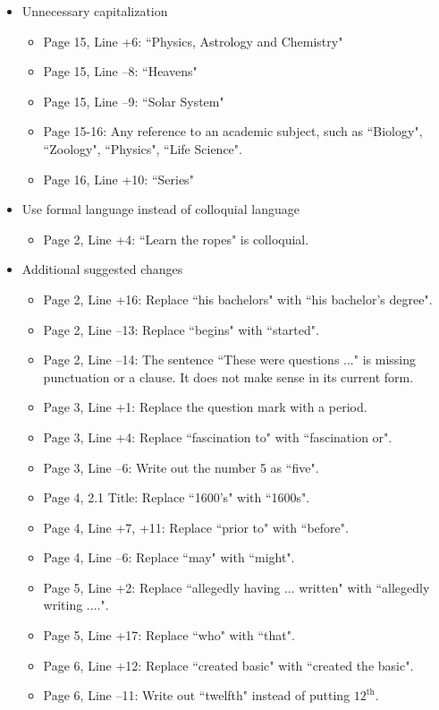 \documentclass[11pt]{article}
\begin{document}
\begin{itemize}
	\item Unnecessary capitalization
	\begin{itemize}
		\item Page 15, Line +6: ``Physics, Astrology and Chemistry"
		\item Page 15, Line --8: ``Heavens"
		\item Page 15, Line --9: ``Solar System"
		\item Page 15-16: Any reference to an academic subject, such as ``Biology", ``Zoology", ``Physics", ``Life Science".
		\item Page 16, Line +10: ``Series"
	\end{itemize}
	\item Use formal language instead of colloquial language
	\begin{itemize}
		\item Page 2, Line +4: ``Learn the ropes" is colloquial.
	\end{itemize}
	\item Additional suggested changes
	\begin{itemize}
		\item Page 2, Line +16: Replace ``his bachelors" with ``his bachelor's degree".
		\item Page 2, Line --13: Replace ``begins" with  ``started".
		\item Page 2, Line --14: The sentence ``These were questions ..." is missing punctuation or a clause. It does not make sense in its current form.
		\item Page 3, Line +1: Replace the question mark with a period.
		\item Page 3, Line +4: Replace ``fascination to" with ``fascination or".
		\item Page 3, Line --6: Write out the number 5 as ``five".
		\item Page 4, 2.1 Title: Replace ``1600's" with ``1600s".
		\item Page 4, Line +7, +11: Replace ``prior to" with ``before".
		\item Page 4, Line --6: Replace ``may" with ``might".
		\item Page 5, Line +2: Replace ``allegedly having ... written" with ``allegedly writing ....".
		\item Page 5, Line +17: Replace ``who" with ``that".
		\item Page 6, Line +12: Replace ``created basic" with ``created the basic".
		\item Page 6, Line --11: Write out ``twelfth" instead of putting $12^{\text{th}}$.

\end{itemize}
\end{itemize}
\end{document}
